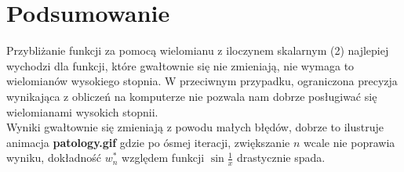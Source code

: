 \documentclass{article}
\begin{document}
\section{Podsumowanie}
Przybliżanie funkcji za pomocą wielomianu z iloczynem skalarnym (2) najlepiej wychodzi dla funkcji, które gwałtownie się nie zmieniają, nie wymaga to wielomianów wysokiego stopnia. W przeciwnym przypadku, ograniczona precyzja wynikająca z obliczeń na komputerze nie pozwala nam dobrze posługiwać się wielomianami wysokich stopnii.\\
Wyniki gwałtownie się zmieniają z powodu małych błędów, dobrze to ilustruje animacja
\textbf{patology.gif} gdzie po ósmej iteracji, zwiększanie $n$ wcale nie poprawia wyniku, dokładność $w_n^*$ względem funkcji $\sin{\frac{1}{x}}$ drastycznie spada.
\end{document}
